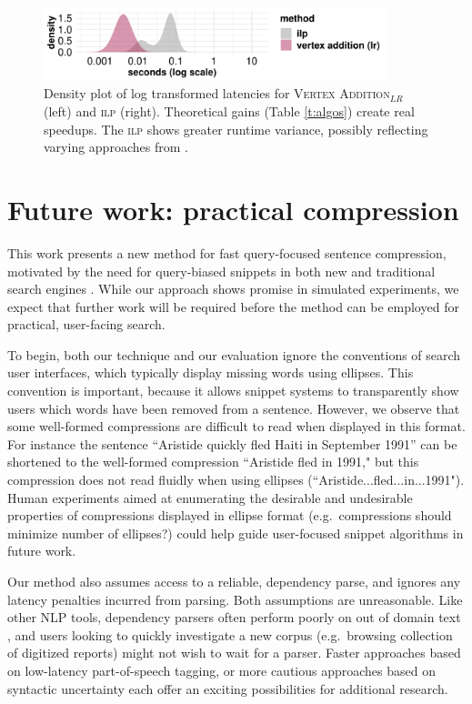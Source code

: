 \documentclass[11pt,a4paper]{article}
\begin{document}
{\begin{figure}[htb!]
\centering
\includegraphics[width=10cm]{times.pdf}
\caption{Density plot of log transformed latencies for \textsc{Vertex Addition}$_{LR}$ (left) and \textsc{ilp} (right). Theoretical gains (Table \ref{t:algos}) create real speedups. The \textsc{ilp} shows greater runtime variance, possibly reflecting varying approaches from \citet{gurobi}.}
\label{t:times}
\end{figure}

\section{Future work: practical compression}

This work presents a new method for fast query-focused sentence compression, motivated by the need for query-biased snippets in both new and traditional search engines \cite{tombros1998advantages,marchionini2006exploratory}. While our approach shows promise in simulated experiments, we expect that further work will be required before the method can be employed for practical, user-facing search.

To begin, both our technique and our evaluation ignore the conventions of search user interfaces, which typically display missing words using ellipses. This convention is important, because it allows snippet systems to transparently show users which words have been removed from a sentence. However, we observe that some well-formed compressions are difficult to read when displayed in this format. For instance the sentence ``Aristide quickly fled Haiti in September 1991'' can be shortened to the well-formed compression ``Aristide fled in 1991," but this compression does not read fluidly when using ellipses (``Aristide...fled...in...1991"). Human experiments aimed at enumerating the desirable and undesirable properties of compressions displayed in ellipse format (e.g.\ compressions should minimize number of ellipses?) could help guide user-focused snippet algorithms in future work. 

Our method also assumes access to a reliable, dependency parse, and ignores any latency penalties incurred from parsing. Both assumptions are unreasonable. Like other NLP tools, dependency parsers often perform poorly on out of domain text \cite{bamman2017natural}, and users looking to quickly investigate a new corpus (e.g.\ browsing collection of digitized reports) might not wish to wait for a parser. Faster approaches based on low-latency part-of-speech tagging, or more cautious approaches based on syntactic uncertainty \cite{keith-etal-2018-monte} each offer an exciting possibilities for additional research. 

}
\end{document}

